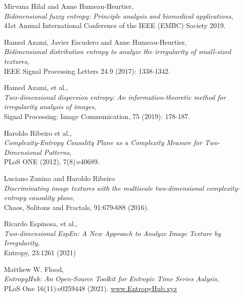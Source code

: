\documentclass[12pt, a4paper, titlepage, openany]{book}
\begin{document}
\begin{thebibliography}{9}
Mirvana Hilal and Anne Humeau-Heurtier,\\
\emph{Bidimensional fuzzy entropy: Principle analysis and biomedical applications},\\
41st Annual International Conference of the IEEE (EMBC) Society 2019.

Hamed Azami, Javier Escudero and Anne Humeau-Heurtier,\\
\emph{Bidimensional distribution entropy to analyze the irregularity of small-sized textures},\\
IEEE Signal Processing Letters 24.9 (2017): 1338-1342.

Hamed Azami, et al.,\\
\emph{Two-dimensional dispersion entropy: An information-theoretic method for irregularity analysis of images},\\
Signal Processing: Image Communication, 75 (2019): 178-187.

Haroldo Ribeiro et al.,\\
\emph{Complexity-Entropy Causality Plane as a Complexity Measure for Two-Dimensional Patterns},\\
PLoS ONE (2012), 7(8):e40689.

Luciano Zunino and Haroldo Ribeiro\\
\emph{Discriminating image textures with the multiscale two-dimensional complexity-entropy causality plane},\\
Chaos, Solitons and Fractals,  91:679-688 (2016).

Ricardo Espinosa, et al.,\\
\emph{Two-dimensional EspEn: A New Approach to Analyze Image Texture by Irregularity},\\
Entropy, 23:1261 (2021)




Matthew W. Flood,\\
\emph{EntropyHub: An Open-Source Toolkit for Entropic Time Series Aalysis},\\
PLoS One 16(11):e0259448 (2021).
\href{www.EntropyHub.xyz}{www.EntropyHub.xyz}

\end{thebibliography}






\newpage
\end{document}
